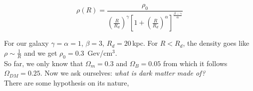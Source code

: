 \documentclass[10.75pt,a4paper,openright,bottom=2cm]{article}
\newcommand{\beginbox}[1]{\begin{tcolorbox}[width=\textwidth,colback={black!40},title={#1},colbacktitle={purple!55},coltitle=black]}
\renewcommand{\endbox}{\end{tcolorbox}\noindent}
\begin{document}
\beginbox{Navarro-Frenk-White Model}
\[
\rho(R)=\frac{\rho_0}{\left(\frac{R}{R_d}\right)^\gamma\left[1+\left(\frac{R}{R_d}\right)^\alpha\right]^{\frac{\beta-\gamma}{\alpha}}}
\]
\endbox
For our galaxy $\gamma=\alpha=1$, $\beta=3$, $R_d=20$\,kpc. For $R<R_d$, the density goes like $\rho\sim\frac{1}{R}$ and we get $\rho_0=0.3$\, Gev/cm$^3$.\\
So far, we only know that $\Omega_m=0.3$ and $\Omega_B=0.05$ from which it follows $\Omega_{DM}=0.25$. Now we ask ourselves: \textit{what is dark matter made of?}\\
There are some hypothesis on its nature, 
\end{document}
